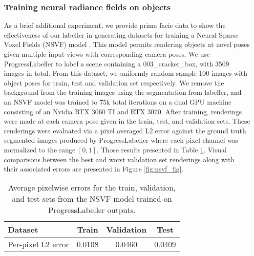\subsubsection{Training neural radiance fields on objects}
As a brief additional experiment, we provide prima facie data to show the effectiveness of our labeller in generating datasets for training a Neural Sparse Voxel Fields (NSVF) model \cite{liu2020neural}. This model permits rendering objects at novel poses given multiple input views with corresponding camera poses. We use ProgressLabeller to label a scene containing a 003\_cracker\_box, with 3509 images in total. From this dataset, we uniformly random sample 100 images with object poses for train, test and validation set respectively. We remove the background from the training images using the segmentation from labeller, and an NSVF model was trained to 75k total iterations on a dual GPU machine consisting of an Nvidia RTX 3060 TI and RTX 3070. After training, renderings were made at each camera pose given in the train, test, and validation sets. These renderings were evaluated via a pixel averaged L2 error against the ground truth segmented images produced by ProgressLabeller where each pixel channel was normalized to the range $[0,1]$. Those results presented in Table \ref{tab:nsvf_metrics}. Visual comparisons between the best and worst validation set renderings along with their associated errors are presented in Figure \ref{fig:nsvf_fig}.

\begin{table}[htbp]
  \centering
  \small
  \begin{tabular}{@{}lccc@{}}
    \toprule
    Dataset & Train & Validation & Test\\
    \midrule
    Per-pixel L2 error & 0.0108 & 0.0460  & 0.0409\\
    \bottomrule
  \end{tabular}
  \caption{Average pixelwise errors for the train, validation, and test sets from the NSVF model trained on ProgressLabeller outputs.}
  \label{tab:nsvf_metrics}
\end{table}